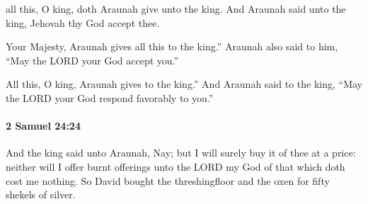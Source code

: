 			\begin{versebox}
					\item[BHS] 
					\item[ASV] all this, O king, doth Araunah give unto the king. And Araunah said unto the king, Jehovah thy God accept thee.
					\item[NIV] Your Majesty, Araunah gives all this to the king.” Araunah also said to him, “May the LORD your God accept you.”
					\item[NRSV] All this, O king, Araunah gives to the king.” And Araunah said to the king, “May the LORD your God respond favorably to you.”
			\end{versebox}

		\paragraph{2 Samuel 24:24} %
			\label{2SAMUEL-24-24}

			And the king said unto Araunah, Nay; but I will surely buy it of thee at a price: neither will I offer burnt offerings unto the LORD my God of that which doth cost me nothing. So David bought the threshingfloor and the oxen for fifty shekels of silver.

